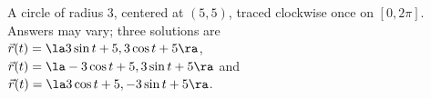 {A circle of radius 3, centered at $(5,5)$, traced clockwise once on $[0,2\pi]$.
}
{
Answers may vary; three solutions are\\
$\vec r(t) = \la 3\sin t+5,3\cos t+5\ra$, \\
$\vec r(t) = \la -3\cos t+5,3\sin t+5\ra$ and \\
$\vec r(t) = \la 3\cos t+5,-3\sin t+5\ra$. 
}

